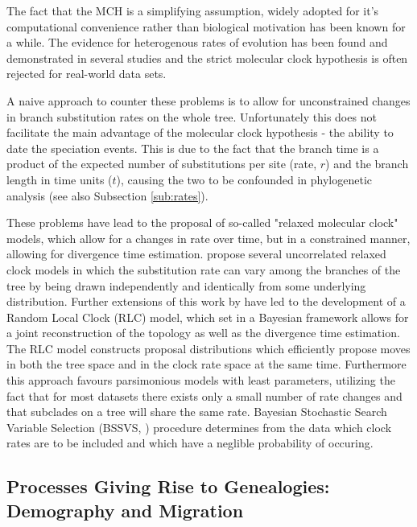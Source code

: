 The fact that the MCH is a simplifying assumption, widely adopted for it's computational convenience rather than biological motivation has been known for a while.
The evidence for heterogenous rates of evolution has been found and demonstrated in several studies \citep{EyreWalker1997,Andreasen2001} and the strict molecular clock hypothesis is often rejected for real-world data sets.

A naive approach to counter these problems is to allow for unconstrained changes in branch substitution rates on the whole tree.
Unfortunately this does not facilitate the main advantage of the molecular clock hypothesis - the ability to date the speciation events.
This is due to the fact that the branch time is a product of the expected number of substitutions per site (rate, $r$) and the branch length in time units ($t$), causing the two to be confounded in phylogenetic analysis (see also Subsection \ref{sub:rates}).

These problems have lead to the proposal of so-called "relaxed molecular clock" models, which allow for a changes in rate over time, but in a constrained manner, allowing for divergence time estimation.
\citet{Drummond2006} propose several uncorrelated relaxed clock models in which the substitution rate can vary among the branches of the tree by being drawn independently and identically from some underlying distribution.
Further extensions of this work by \citet{Drummond2010} have led to the development of a Random Local Clock (RLC) model, which set in a Bayesian framework allows for a joint reconstruction of the topology as well as the divergence time estimation. 
The RLC model constructs proposal distributions which efficiently propose moves in both the tree space and in the clock rate space at the same time. %
Furthermore this approach favours parsimonious models with least parameters, utilizing the fact that for most datasets there exists only a small number of rate changes and that subclades on a tree will share the same rate.
Bayesian Stochastic Search Variable Selection (BSSVS, \citet{Lemey2009}) procedure determines from the data which clock rates are to be included and which have a neglible probability of occuring.

\subsection{Processes Giving Rise to Genealogies: Demography and Migration\label{sub:molecular_clock}}

